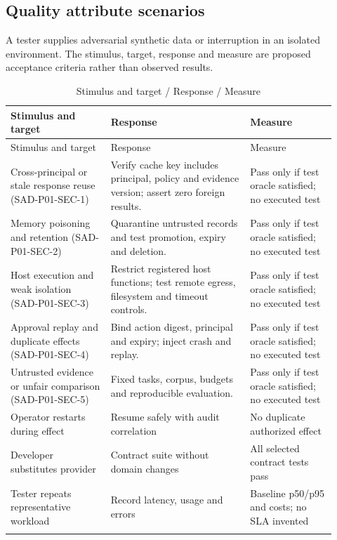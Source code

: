 \documentclass[10pt,letterpaper]{article}
\begin{document}
\subsection{Quality attribute scenarios}
A tester supplies adversarial synthetic data or interruption in an isolated environment. The stimulus, target, response and measure are proposed acceptance criteria rather than observed results.
\begin{longtable}{@{}>{\raggedright\arraybackslash}p{0.29\linewidth}>{\raggedright\arraybackslash}p{0.39\linewidth}>{\raggedright\arraybackslash}p{0.24\linewidth}@{}}
\caption{Stimulus and target / Response / Measure}\\
\toprule Stimulus and target & Response & Measure\\\midrule\endfirsthead
\toprule Stimulus and target & Response & Measure\\\midrule\endhead
Cross-principal or stale response reuse (SAD-P01-SEC-1) & Verify cache key includes principal, policy and evidence version; assert zero foreign results. & Pass only if test oracle satisfied; no executed test\\\addlinespace
Memory poisoning and retention (SAD-P01-SEC-2) & Quarantine untrusted records and test promotion, expiry and deletion. & Pass only if test oracle satisfied; no executed test\\\addlinespace
Host execution and weak isolation (SAD-P01-SEC-3) & Restrict registered host functions; test remote egress, filesystem and timeout controls. & Pass only if test oracle satisfied; no executed test\\\addlinespace
Approval replay and duplicate effects (SAD-P01-SEC-4) & Bind action digest, principal and expiry; inject crash and replay. & Pass only if test oracle satisfied; no executed test\\\addlinespace
Untrusted evidence or unfair comparison (SAD-P01-SEC-5) & Fixed tasks, corpus, budgets and reproducible evaluation. & Pass only if test oracle satisfied; no executed test\\\addlinespace
Operator restarts during effect & Resume safely with audit correlation & No duplicate authorized effect\\\addlinespace
Developer substitutes provider & Contract suite without domain changes & All selected contract tests pass\\\addlinespace
Tester repeats representative workload & Record latency, usage and errors & Baseline p50/p95 and costs; no SLA invented\\\addlinespace
\bottomrule\end{longtable}
\end{document}
